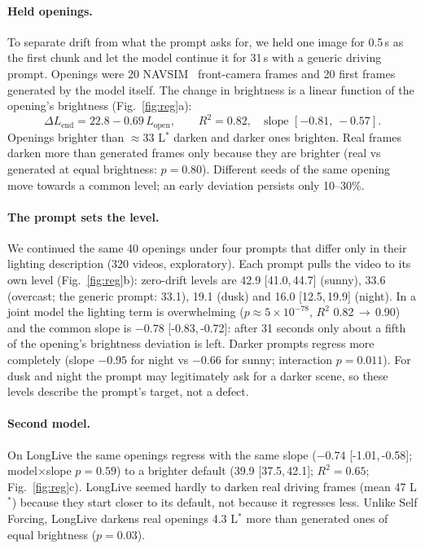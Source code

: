 \documentclass[11pt]{article}
\newcommand{\Lstar}{L$^{*}$}
\newcommand{\ci}[2]{[#1,\,#2]}
\begin{document}
\paragraph{Held openings.} To separate drift from what the prompt asks for, we held one image for 0.5\,s as the first
chunk and let the model continue it for 31\,s with a generic driving prompt. Openings were 20 NAVSIM~\cite{navsim}
front-camera frames and 20 first frames generated by the model itself. The change in brightness is a linear function
of the opening's brightness (Fig.~\ref{fig:reg}a):
\[
\Delta L_\text{end} = 22.8 - 0.69\,L_\text{open},\qquad R^2=0.82,\quad\text{slope } \ci{-0.81}{-0.57}.
\]
Openings brighter than $\approx$33 \Lstar{} darken and darker ones brighten. Real frames darken more than generated
frames only because they are brighter (real vs generated at equal brightness: $p=0.80$). Different seeds of the same
opening move towards a common level; an early deviation persists only 10--30\%.

\paragraph{The prompt sets the level.} We continued the same 40 openings under four prompts that differ only in
their lighting description (320 videos, exploratory). Each prompt pulls the video to its own level
(Fig.~\ref{fig:reg}b): zero-drift levels are 42.9 \ci{41.0}{44.7} (sunny), 33.6 (overcast; the generic prompt: 33.1),
19.1 (dusk) and 16.0 \ci{12.5}{19.9} (night). In a joint model the lighting term is overwhelming ($p\approx5\times10^{-78}$,
$R^2$ 0.82\,$\to$\,0.90) and the common slope is $-0.78$ \ci{-0.83}{-0.72}: after 31 seconds only about a fifth of
the opening's brightness deviation is left. Darker prompts regress more completely (slope $-0.95$ for night vs $-0.66$
for sunny; interaction $p=0.011$). For dusk and night the prompt may legitimately ask for a darker scene, so these
levels describe the prompt's target, not a defect.

\paragraph{Second model.} On LongLive the same openings regress with the same slope ($-0.74$ \ci{-1.01}{-0.58};
model$\times$slope $p=0.59$) to a brighter default (39.9 \ci{37.5}{42.1}; $R^2=0.65$; Fig.~\ref{fig:reg}c). LongLive
seemed hardly to darken real driving frames (mean 47 \Lstar) because they start closer to its default, not because
it regresses less. Unlike Self Forcing, LongLive darkens real openings 4.3 \Lstar{} more than generated ones of equal
brightness ($p=0.03$).
\end{document}
